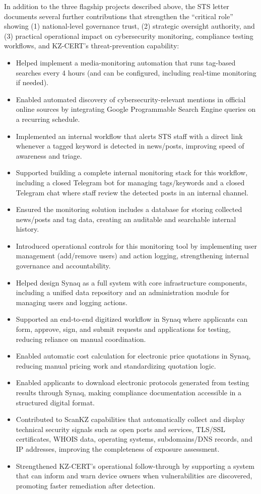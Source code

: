 In addition to the three flagship projects described above, the STS letter documents several further contributions that strengthen the ``critical role'' showing (1) national-level governance trust, (2) strategic oversight authority, and (3) practical operational impact on cybersecurity monitoring, compliance testing workflows, and KZ-CERT’s threat-prevention capability:
\vspace{-0.5\baselineskip}
\begin{itemize}[nosep]
\item Helped implement a media-monitoring automation that runs tag-based searches every 4 hours (and can be configured, including real-time monitoring if needed).
\item Enabled automated discovery of cybersecurity-relevant mentions in official online sources by integrating Google Programmable Search Engine queries on a recurring schedule.
\item Implemented an internal workflow that alerts STS staff with a direct link whenever a tagged keyword is detected in news/posts, improving speed of awareness and triage.
\item Supported building a complete internal monitoring stack for this workflow, including a closed Telegram bot for managing tags/keywords and a closed Telegram chat where staff review the detected posts in an internal channel.
\item Ensured the monitoring solution includes a database for storing collected news/posts and tag data, creating an auditable and searchable internal history.
\item Introduced operational controls for this monitoring tool by implementing user management (add/remove users) and action logging, strengthening internal governance and accountability.
\item Helped design Synaq as a full system with core infrastructure components, including a unified data repository and an administration module for managing users and logging actions.
\item Supported an end-to-end digitized workflow in Synaq where applicants can form, approve, sign, and submit requests and applications for testing, reducing reliance on manual coordination.
\item Enabled automatic cost calculation for electronic price quotations in Synaq, reducing manual pricing work and standardizing quotation logic.
\item Enabled applicants to download electronic protocols generated from testing results through Synaq, making compliance documentation accessible in a structured digital format.
\item Contributed to ScanKZ capabilities that automatically collect and display technical security signals such as open ports and services, TLS/SSL certificates, WHOIS data, operating systems, subdomains/DNS records, and IP addresses, improving the completeness of exposure assessment.
\item Strengthened KZ-CERT’s operational follow-through by supporting a system that can inform and warn device owners when vulnerabilities are discovered, promoting faster remediation after detection.
\end{itemize}

